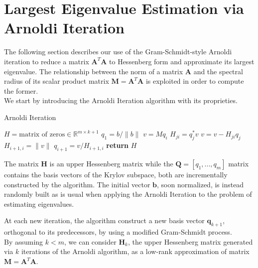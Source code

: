 \documentclass{article}
\numberwithin{equation}{section}
\begin{document}
\section{Largest Eigenvalue Estimation via Arnoldi Iteration}
The following section describes our use of the Gram-Schmidt-style Arnoldi iteration to reduce a  matrix $\boldsymbol{A}^T\boldsymbol{A}$ to Hessenberg form and approximate its largest eigenvalue. The relationship between the norm of a matrix $\boldsymbol{A}$ and the spectral radius of its scalar product matrix $\boldsymbol{M}=\boldsymbol{A}^T\boldsymbol{A}$ is exploited in order to compute the former.\\

We start by introducing the Arnoldi Iteration algorithm with its proprieties.

\begin{algorithm}
\caption{Arnoldi Iteration}\label{alg:cap}
\begin{algorithmic}
\State $H = \text{matrix of zeros} \in \mathbb R^{m \times k+1}$
\State $q_1 = b/ \|b\|$
    \State $v=Mq_i$
        \State $H_{ji}=q_j^*v$
        \State $v=v-H_{ji}q_j$
    \EndFor
    \State $H_{i+1,i}=\|v\|$
    \State $q_{i+1}= v/H_{i+1,i}$
\EndFor
\State \textbf{return} $H$
\EndProcedure
\end{algorithmic}
\end{algorithm}

The matrix $\boldsymbol{H}$ is an upper Hessenberg matrix  while the $\boldsymbol{Q}=[q_1,...,q_m]$ matrix contains the basis vectors of the Krylov subspace, both are incrementally constructed by the algorithm. The initial vector $\boldsymbol{b}$, soon normalized, is instead randomly built as is usual when applying the Arnoldi Iteration to the problem of estimating eigenvalues. 

At each new iteration, the algorithm construct a new basis vector $\boldsymbol{q}_{k+1}$, orthogonal to its predecessors, by using a modified Gram-Schmidt process.\\

By assuming $k < m$, we can consider $\boldsymbol{H}_k$, the upper Hessenberg matrix generated via $k$ iterations of the Arnoldi algorithm, as a low-rank approximation of matrix $\boldsymbol{M}=\boldsymbol{A}^T\boldsymbol{A}$. 
\end{document}
